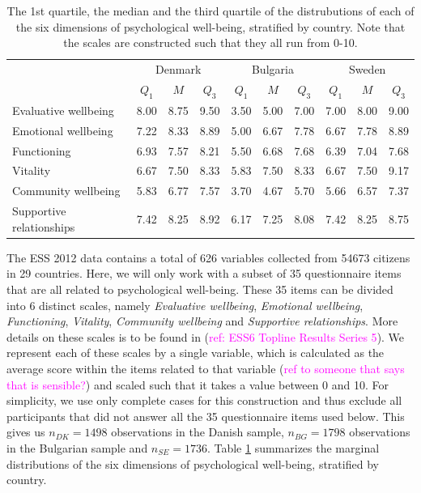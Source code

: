 \documentclass[titlepage,11pt,twoside]{article}
\newcommand{\hl}[1]{\textcolor{magenta}{#1}}
\begin{document}
\begin{table}[t]
\centering
\begin{tabular}{lccccccccc}
  \hline
  & \multicolumn{3}{c}{Denmark} & \multicolumn{3}{c}{Bulgaria} & \multicolumn{3}{c}{Sweden} \\
 & $Q_1$ & $M$ & $Q_3$ \quad & $Q_1$ & $M$ & $Q_3$ \quad & $Q_1$ & $M$ & $Q_3$ \\ 
  \hline
 Evaluative wellbeing & 8.00 & 8.75 & 9.50 & 3.50 & 5.00 & 7.00 & 7.00 & 8.00 & 9.00 \\ 
 Emotional wellbeing & 7.22 & 8.33 & 8.89 & 5.00 & 6.67 & 7.78 & 6.67 & 7.78 & 8.89 \\ 
Functioning & 6.93 & 7.57 & 8.21 & 5.50 & 6.68 & 7.68 & 6.39 & 7.04 & 7.68 \\ 
Vitality & 6.67 & 7.50 & 8.33 & 5.83 & 7.50 & 8.33 & 6.67 & 7.50 & 9.17 \\ 
 Community wellbeing & 5.83 & 6.77 & 7.57 & 3.70 & 4.67 & 5.70 & 5.66 & 6.57 & 7.37 \\ 
Supportive relationships & 7.42 & 8.25 & 8.92 & 6.17 & 7.25 & 8.08 & 7.42 & 8.25 & 8.75 \\ 
   \hline
\end{tabular}
\caption{The 1st quartile, the median and the third quartile of the distrubutions of each of the six dimensions of psychological well-being, stratified by country. Note that the scales are constructed such that they all run from 0-10.}
\label{tableDistr}
\end{table}


The ESS 2012 data contains a total of 626 variables collected from 54673 citizens in 29 countries. Here, we will only work with a subset of 35 questionnaire items that are all related to psychological well-being. These 35 items can be divided into 6 distinct scales, namely \textit{Evaluative wellbeing}, \textit{Emotional wellbeing}, \textit{Functioning}, \textit{Vitality}, \textit{Community wellbeing} and \textit{Supportive relationships}. More details on these scales is to be found in (\hl{ref: ESS6 Topline Results Series 5}). We represent each of these scales by a single variable, which is calculated as the average score within the items related to that variable (\hl{ref to someone that says that is sensible?}) and scaled such that it takes a value between 0 and 10. For simplicity, we use only complete cases for this construction and thus exclude all participants that did not answer all the 35 questionnaire items used below. This gives us $n_{DK} = 1498$ observations in the Danish sample, $n_{BG} = 1798$ observations in the Bulgarian sample and $n_{SE} = 1736$. Table \ref{tableDistr} summarizes the marginal distributions of the six dimensions of psychological well-being, stratified by country. 
\end{document}
